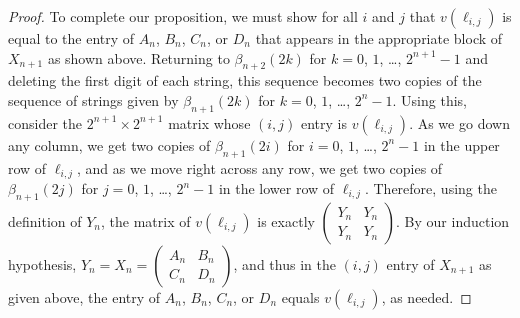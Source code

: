 \documentclass[12pt]{article}
\theoremstyle{plain}
\theoremstyle{remark}
\theoremstyle{definition}
\theoremstyle{remark}
\theoremstyle{definition}
\begin{document}
\begin{proof}
To complete our proposition, we must show for all $i$ and $j$ that $v\left(\ell_{i,j}\right)$ is equal to the entry of $A_{n}$, $B_{n}$, $C_{n}$, or $D_{n}$ that appears in the appropriate block of $X_{n+1}$ as shown above. Returning to $\beta_{n+2}\left(2k\right)$ for $k=0$, $1$, \ldots , $2^{n+1}-1$ and deleting the first digit of each string, this sequence becomes two copies of the sequence of strings given by $\beta_{n+1}\left(2k\right)$ for $k=0$, $1$, \ldots , $2^{n}-1$. Using this, consider the $2^{n+1}\times2^{n+1}$ matrix whose $\left(i,j\right)$ entry is $v\left(\ell_{i,j}\right)$. As we go down any column, we get two copies of $\beta_{n+1}\left(2i\right)$ for $i=0$, $1$, \ldots , $2^{n}-1$ in the upper row of $\ell_{i,j}$, and as we move right across any row, we get two copies of $\beta_{n+1}\left(2j\right)$ for $j=0$, $1$, \ldots , $2^{n}-1$ in the lower row of $\ell_{i,j}$. Therefore, using the definition of $Y_{n}$, the matrix of $v\left(\ell_{i,j}\right)$ is exactly $\begin{pmatrix}Y_{n} & Y_{n}\\ Y_{n} & Y_{n} \end{pmatrix}$. By our induction hypothesis, $Y_{n}=X_{n}=\begin{pmatrix}A_{n} & B_{n}\\ C_{n} & D_{n} \end{pmatrix}$, and thus in the $\left(i,j\right)$ entry of $X_{n+1}$ as given above, the entry of $A_{n}$, $B_{n}$, $C_{n}$, or $D_{n}$ equals $v\left(\ell_{i,j}\right)$, as needed.
\end{proof}
\end{document}
